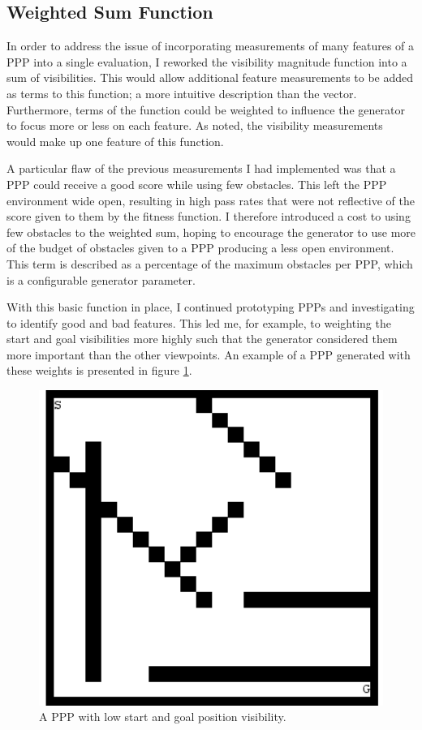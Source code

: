 \documentclass[authoryearcitations]{UoYCSproject}
\begin{document}
\subsection{Weighted Sum Function}
\label{sec:weighted_sum}
In order to address the issue of incorporating measurements of many features of a PPP into a single evaluation, I reworked the visibility magnitude function into a sum of visibilities. This would allow additional feature measurements to be added as terms to this function; a more intuitive description than the vector. Furthermore, terms of the function could be weighted to influence the generator to focus more or less on each feature. As noted, the visibility measurements would make up one feature of this function.

A particular flaw of the previous measurements I had implemented was that a PPP could receive a good score while using few obstacles. This left the PPP environment wide open, resulting in high pass rates that were not reflective of the score given to them by the fitness function. I therefore introduced a cost to using few obstacles to the weighted sum, hoping to encourage the generator to use more of the budget of obstacles given to a PPP producing a less open environment. This term is described as a percentage of the maximum obstacles per PPP, which is a configurable generator parameter.

With this basic function in place, I continued prototyping PPPs and investigating to identify good and bad features. This led me, for example, to weighting the start and goal visibilities more highly such that the generator considered them more important than the other viewpoints. An example of a PPP generated with these weights is presented in figure \ref{fig:weighted_sum_ppp}.

\begin{figure}
\graphicspath{ {DesignImpPics/} }
\includegraphics[width=1\textwidth]{goalStartVis.png}
\caption{A PPP with low start and goal position visibility.}
\label{fig:weighted_sum_ppp}
\end{figure}
\end{document}

